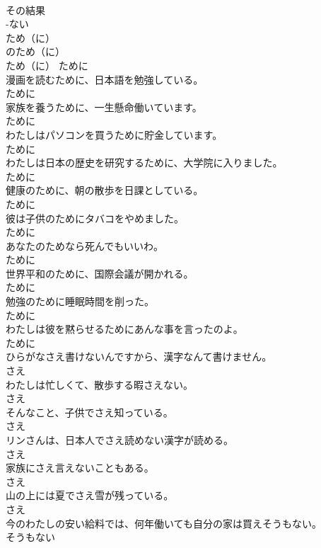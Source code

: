 \documentclass[8pt]{extreport}
\begin{document}
\begin{CJK}{UTF8}{min}
\\	その結果	
\\	-ない
\\	ため（に）	
\\	のため（に）	
\\	ため（に）	ために	
\\	漫画を読むために、日本語を勉強している。	
\\	ために	
\\	家族を養うために、一生懸命働いています。	
\\	ために	
\\	わたしはパソコンを買うために貯金しています。	
\\	ために	
\\	わたしは日本の歴史を研究するために、大学院に入りました。	
\\	ために	
\\	健康のために、朝の散歩を日課としている。	
\\	ために	
\\	彼は子供のためにタバコをやめました。	
\\	ために	
\\	あなたのためなら死んでもいいわ。	
\\	ために	
\\	世界平和のために、国際会議が開かれる。	
\\	ために	
\\	勉強のために睡眠時間を削った。	
\\	ために	
\\	わたしは彼を黙らせるためにあんな事を言ったのよ。	
\\	ために	
\\	ひらがなさえ書けないんですから、漢字なんて書けません。	
\\	さえ	
\\	わたしは忙しくて、散歩する暇さえない。	
\\	さえ	
\\	そんなこと、子供でさえ知っている。	
\\	さえ	
\\	リンさんは、日本人でさえ読めない漢字が読める。	
\\	さえ	
\\	家族にさえ言えないこともある。	
\\	さえ	
\\	山の上には夏でさえ雪が残っている。	
\\	さえ	
\\	今のわたしの安い給料では、何年働いても自分の家は買えそうもない。	
\\	そうもない	

\end{CJK}
\end{document}
